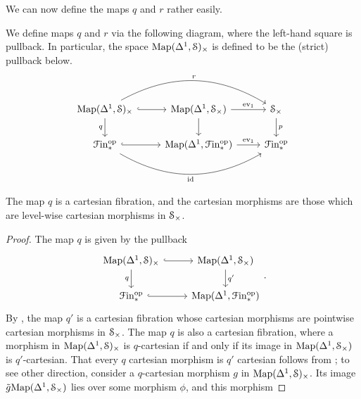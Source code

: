 \documentclass[main.tex]{subfiles}
\begin{document}
We can now define the maps $q$ and $r$ rather easily.

\begin{definition}
  We define maps $q$ and $r$ via the following diagram, where the left-hand square is pullback. In particular, the space $\Map(\Delta^{1}, \S)_{\times}$ is defined to be the (strict) pullback below.
  \begin{equation*}
    \begin{tikzcd}
      \Map(\Delta^{1}, \S)_{\times}
      \arrow[r, hook]
      \arrow[rr, bend left, "r"]
      \arrow[d, swap, "q"]
      & \Map(\Delta^{1}, \S_{\times})
      \arrow[r, "\ev_{1}"]
      \arrow[d]
      & \S_{\times}
      \arrow[d, "p"]
      \\
      \Finp\op
      \arrow[r, hook]
      \arrow[rr, bend right, swap, "\id"]
      & \Map(\Delta^{1}, \Finp\op)
      \arrow[r, "\ev_{1}"]
      & \Finp\op
    \end{tikzcd}
  \end{equation*}
\end{definition}

\begin{lemma}
  The map $q$ is a cartesian fibration, and the cartesian morphisms are those which are level-wise cartesian morphisms in $\S_{\times}$.
\end{lemma}
\begin{proof}
  The map $q$ is given by the pullback
  \begin{equation*}
    \begin{tikzcd}
      \Map(\Delta^{1}, \category{S})_{\times}
      \arrow[r, hook]
      \arrow[d, swap, "q"]
      & \Map(\Delta^{1}, \category{S}_{\times})
      \arrow[d, "q'"]
      \\
      \Finp\op
      \arrow[r, hook]
      & \Map(\Delta^{1}, \Finp\op)
    \end{tikzcd}.
  \end{equation*}
  By \cite[Prop.\ 3.1.2.1]{highertopostheory}, the map $q'$ is a cartesian fibration whose cartesian morphisms are pointwise cartesian morphisms in $\S_{\times}$. The map $q$ is also a cartesian fibration, where a morphism in $\Map(\Delta^{1}, \S)_{\times}$ is $q$-cartesian if and only if its image in $\Map(\Delta^{1}, \S_{\times})$ is $q'$-cartesian. That every $q$ cartesian morphism is $q'$ cartesian follows from \cite[Prop\ 2.4.1.3]{highertopostheory}; to see other direction, consider a $q$-cartesian morphism $g$ in $\Map(\Delta^{1}, \S)_{\times}$. Its image $\tilde{g}\Map(\Delta^{1}, \S_{\times})$ lies over some morphism $\phi$, and this morphism
\end{proof}
\end{document}
